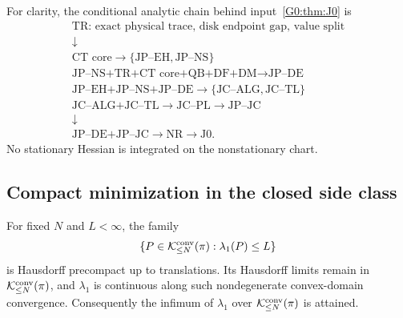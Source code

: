 For clarity, the conditional analytic chain behind input~\ref{G0:thm:J0} is
\begin{equation}\label{G0:eq:analytic-chain}
 \begin{gathered}
 \text{TR: exact physical trace, disk endpoint gap, value split}\\
 \downarrow\\
 \text{CT core}\longrightarrow\{\text{JP--EH},\text{JP--NS}\}\\
 \text{JP--NS+TR+CT core+QB+DF+DM}\longrightarrow\text{JP--DE}\\
 \text{JP--EH+JP--NS+JP--DE}\longrightarrow
 \{\text{JC--ALG},\text{JC--TL}\}\\
 \text{JC--ALG+JC--TL}\longrightarrow\text{JC--PL}
 \longrightarrow\text{JP--JC}\\
 \downarrow\\
 \text{JP--DE+JP--JC}\longrightarrow\text{NR}\longrightarrow\text{J0}.
 \end{gathered}
\end{equation}
No stationary Hessian is integrated on the nonstationary chart.

\subsection{Compact minimization in the closed side class}

\begin{lemma}\label{G0:lem:compact}
For fixed $N$ and $L<\infty$, the family
\begin{equation}\label{G0:eq:sublevel}
 \{P\in\mathcal K_{\le N}^{\rm conv}(\pi):
       \lambda_1(P)\le L\}
\end{equation}
is Hausdorff precompact up to translations.  Its Hausdorff limits remain
in $\mathcal K_{\le N}^{\rm conv}(\pi)$, and $\lambda_1$ is continuous along
such nondegenerate convex-domain convergence.  Consequently the infimum
of $\lambda_1$ over $\mathcal K_{\le N}^{\rm conv}(\pi)$ is attained.
\end{lemma}

